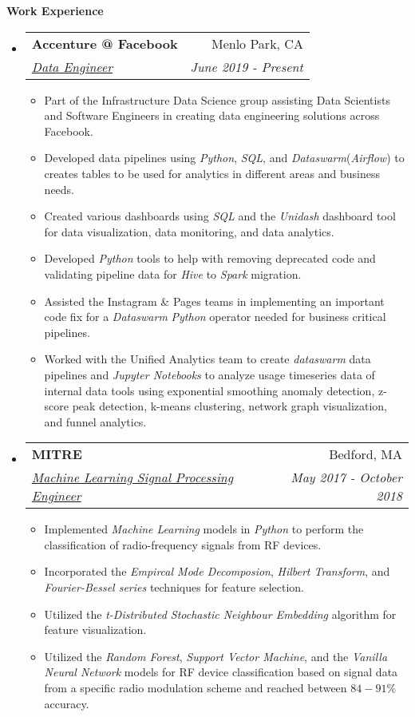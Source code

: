 \documentclass[letterpaper, 8pt]{extarticle}
\makeatletter
\newcommand{\resitem}[1]{\item #1 \vspace{-2pt}}
\newcommand{\resheading}[1]{{\large \colorbox{mygrey}{\begin{minipage}{0.99\textwidth}{\textbf{#1 \vphantom{p\^{E}}}}\end{minipage}}}}
\newcommand{\ressubheading}[4]{
\begin{tabular*}{7.40in}{l@{\extracolsep{\fill}}r}
		\textbf{#1} & #2 \\
		\textit{#3} & \textit{#4} \\
\end{tabular*}\vspace{-6pt}}
\makeatother
\begin{document}
\resheading{Work Experience}
\begin{itemize}
\setlength{\leftmargini}{0.5em}

\item
    \ressubheading{Accenture @ Facebook}{Menlo Park, CA}{\underline{Data Engineer}}{June 2019 - Present}
    \begin{itemize}
        \resitem{Part of the Infrastructure Data Science group assisting Data Scientists and Software Engineers in creating data engineering solutions across Facebook.}
        \resitem{Developed data pipelines using \emph{Python}, \emph{SQL}, and \emph{Dataswarm}(\emph{Airflow}) to creates tables to be used for analytics in different areas and business needs.}
        \resitem{Created various dashboards using \emph{SQL} and the \emph{Unidash} dashboard tool for data visualization, data monitoring, and data analytics.}
        \resitem{Developed \emph{Python} tools to help with removing deprecated code and validating pipeline data for \emph{Hive} to \emph{Spark} migration.}
        \resitem{Assisted the Instagram \& Pages teams in implementing an important code fix for a  \emph{Dataswarm} \emph{Python} operator needed for business critical pipelines. }
        \resitem{Worked with the Unified Analytics team to create \emph{dataswarm} data pipelines and \emph{Jupyter Notebooks} to analyze usage timeseries data of internal data tools using exponential smoothing anomaly detection, z-score peak detection, k-means clustering, network graph visualization, and funnel analytics.}
        
    \end{itemize}

\item
	\ressubheading{MITRE}{Bedford, MA}{\underline{Machine Learning Signal Processing Engineer}}{May 2017 - October 2018}
	\begin{itemize}
	
	    \resitem{Implemented \emph{Machine Learning} models in \emph{Python} to perform the classification of radio-frequency signals from RF devices.}
	    
	    \resitem{Incorporated the \emph{Empircal Mode Decomposion}, \emph{Hilbert Transform}, and \emph{Fourier-Bessel series} techniques for feature selection.}
	    
	    \resitem{Utilized the  \emph{t-Distributed Stochastic Neighbour Embedding} algorithm for feature visualization.}
	    
	    \resitem{Utilized the \emph{Random Forest}, \emph{Support Vector Machine}, and the \emph{Vanilla Neural Network} models for RF device classification based on signal data from a specific radio modulation scheme and reached between $84 - 91 \% $ accuracy.}
	    

\end{itemize}
\end{itemize}
\end{document}
